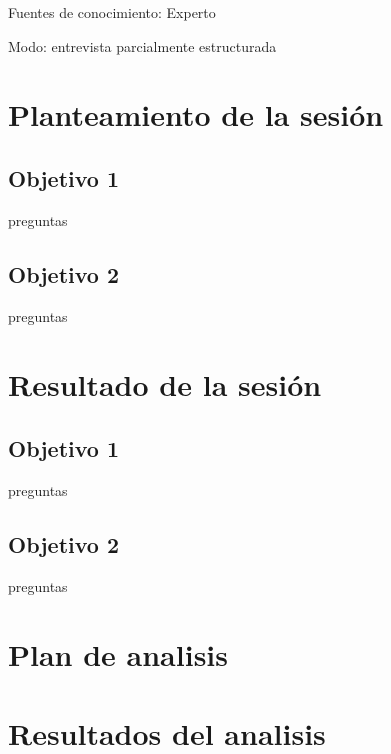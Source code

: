 \documentclass[a4paper,12pt]{article}
\begin{document}
Fuentes de conocimiento: Experto

Modo: entrevista parcialmente estructurada

\section{Planteamiento de la sesión}
\subsection{Objetivo 1}
preguntas
\subsection{Objetivo 2}
preguntas

\section{Resultado de la sesión}
\subsection{Objetivo 1}
preguntas
\subsection{Objetivo 2}
preguntas

\section{Plan de analisis}

\section{Resultados del analisis}
\end{document}
